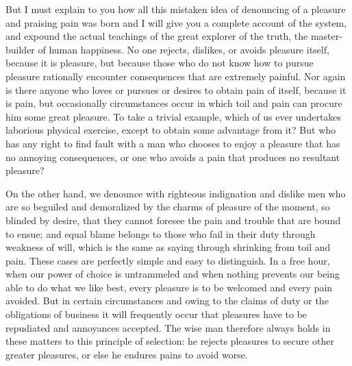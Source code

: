 But I must explain to you how all this mistaken idea of denouncing of a pleasure and praising pain was born and I will give you a complete account of the system, and expound the actual teachings of the great explorer of the truth, the master-builder of human happiness.
No one rejects, dislikes, or avoids pleasure itself, because it is pleasure, but because those who do not know how to pursue pleasure rationally encounter consequences that are extremely painful.
Nor again is there anyone who loves or pursues or desires to obtain pain of itself, because it is pain, but occasionally circumstances occur in which toil and pain can procure him some great pleasure.
To take a trivial example, which of us ever undertakes laborious physical exercise, except to obtain some advantage from it?
But who has any right to find fault with a man who chooses to enjoy a pleasure that has no annoying consequences, or one who avoids a pain that produces no resultant pleasure?

On the other hand, we denounce with righteous indignation and dislike men who are so beguiled and demoralized by the charms of pleasure of the moment, so blinded by desire, that they cannot foresee the pain and trouble that are bound to ensue; and equal blame belongs to those who fail in their duty through weakness of will, which is the same as saying through shrinking from toil and pain. 
These cases are perfectly simple and easy to distinguish.
In a free hour, when our power of choice is untrammeled and when nothing prevents our being able to do what we like best, every pleasure is to be welcomed and every pain avoided.
But in certain circumstances and owing to the claims of duty or the obligations of business it will frequently occur that pleasures have to be repudiated and annoyances accepted.
The wise man therefore always holds in these matters to this principle of selection: he rejects pleasures to secure other greater pleasures, or else he endures pains to avoid worse.